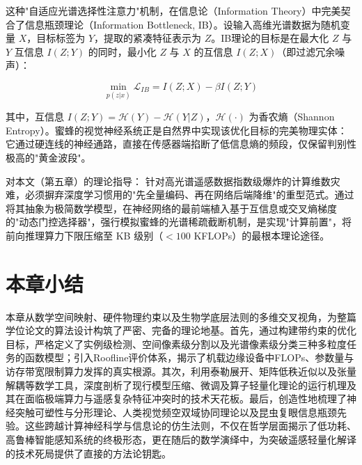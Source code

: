 这种"自适应光谱选择性注意力"机制，在信息论（Information Theory）中完美契合了信息瓶颈理论（Information Bottleneck, IB）。设输入高维光谱数据为随机变量 $X$，目标标签为 $Y$，提取的紧凑特征表示为 $Z$。IB理论的目标是在最大化 $Z$ 与 $Y$ 互信息 $I(Z;Y)$ 的同时，最小化 $Z$ 与 $X$ 的互信息 $I(Z;X)$（即过滤冗余噪声）：

\begin{equation}
\min_{p(z|x)} \mathcal{L}_{IB} = I(Z;X) - \beta I(Z;Y)
\end{equation}

其中，互信息 $I(Z;Y) = \mathcal{H}(Y) - \mathcal{H}(Y|Z)$，$\mathcal{H}(\cdot)$ 为香农熵（Shannon Entropy）。蜜蜂的视觉神经系统正是自然界中实现该优化目标的完美物理实体：它通过硬连线的神经通路，直接在传感器端掐断了低信息熵的频段，仅保留判别性极高的"黄金波段"。

对本文（第五章）的理论指导： 针对高光谱遥感数据指数级爆炸的计算维数灾难，必须摒弃深度学习惯用的"先全量编码、再在网络后端降维"的重型范式。通过将其抽象为极简数学模型，在神经网络的最前端植入基于互信息或交叉熵梯度的"动态门控选择器"，强行模拟蜜蜂的光谱稀疏截断机制，是实现"计算前置"，将前向推理算力下限压缩至 KB 级别（$<100$ KFLOPs）的最根本理论途径。

\section{本章小结}

本章从数学空间映射、硬件物理约束以及生物学底层法则的多维交叉视角，为整篇学位论文的算法设计构筑了严密、完备的理论地基。首先，通过构建带约束的优化目标，严格定义了实例级检测、空间像素级分割以及光谱像素级分类三种多粒度任务的函数模型；引入Roofline评价体系，揭示了机载边缘设备中FLOPs、参数量与访存带宽限制算力发挥的真实根源。其次，利用泰勒展开、矩阵低秩近似以及张量解耦等数学工具，深度剖析了现行模型压缩、微调及算子轻量化理论的运行机理及其在面临极端算力与遥感复杂特征冲突时的技术天花板。最后，创造性地梳理了神经突触可塑性与分形理论、人类视觉频空双域协同理论以及昆虫复眼信息瓶颈先验。这些跨越计算神经科学与信息论的仿生法则，不仅在哲学层面揭示了低功耗、高鲁棒智能感知系统的终极形态，更在随后的数学演绎中，为突破遥感轻量化解译的技术死局提供了直接的方法论钥匙。

